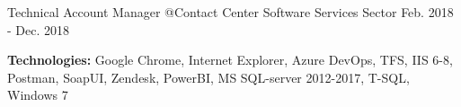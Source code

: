 \begin{cventries}
  \cventry
    {Technical Account Manager @Contact Center Software Services Sector %
    } %
    {} %
    {} %
    {Feb. 2018 - Dec. 2018} %
    {
      \begin{cvitems} %
		\item[] {\textbf{Technologies:} 
		\textcolor{rainbowcolor-olive}{Google Chrome}, 
		\textcolor{rainbowcolor-olive}{Internet Explorer}, 
		\textcolor{rainbowcolor-olive}{Azure DevOps}, 
		\textcolor{rainbowcolor-olive}{TFS}, 
		\textcolor{rainbowcolor-olive}{IIS 6-8}, 
		\textcolor{rainbowcolor-olive}{Postman}, 
		\textcolor{rainbowcolor-olive}{SoapUI}, 
		\textcolor{rainbowcolor-olive}{Zendesk}, 
		\textcolor{rainbowcolor-olive}{PowerBI}, 
		\textcolor{rainbowcolor-olive}{MS SQL-server 2012-2017}, 
		\textcolor{rainbowcolor-indigo}{T-SQL}, 
		\textcolor{rainbowcolor-orange}{Windows 7}}		
      \end{cvitems}
    } 
    

\end{cventries}
